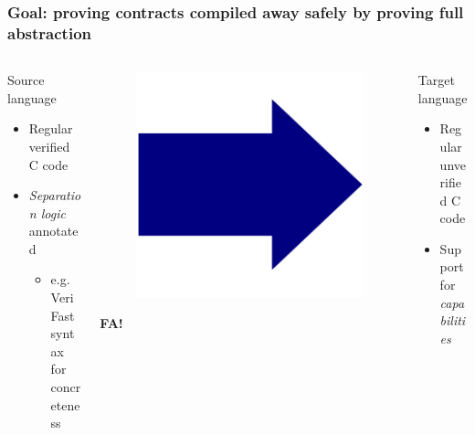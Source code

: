 \documentclass{beamer}
\begin{document}
\begin{frame}
\frametitle{Goal: proving contracts compiled away safely by proving full abstraction}
\begin{columns}%
\begin{column}{0.45\textwidth}
	\begin{block}{Source language}
	\begin{itemize}
	\item Regular verified C code
	\item \emph{Separation logic} annotated
		\begin{itemize}
		\item e.g. VeriFast syntax for concreteness
		\end{itemize}
	\end{itemize}
	\end{block}
\end{column}
\begin{column}{0.08\textwidth}
	\begin{figure}
	\includegraphics[width=0.8\linewidth]{BlueArrow}
	\end{figure}\vspace{-2em}
	\center \textbf{FA!}
\end{column}
\begin{column}{0.45\textwidth}
    \begin{block}{Target language}
	\begin{itemize}
	\item Regular unverified C code
	\item Support for \emph{capabilities}\\

\end{itemize}
\end{block}
\end{column}
\end{columns}
\end{frame}
\end{document}

